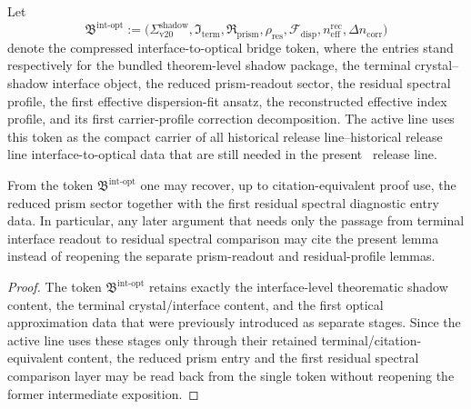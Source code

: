 \begin{definition}
\label{def:v320-crystal-shadow-interface-object}
\label{def:reduced-prism-readout-sector}
\label{def:prism-readout-residual-profile}
\label{def:first-effective-carrier-dispersion-fit-ansatz}
\label{def:first-reconstructed-effective-refractive-profile}
\label{def:first-carrier-profile-correction-decomposition}
Let
\[
\mathfrak B^{\mathrm{int\text{-}opt}}
:=
\bigl(
\Sigma^{\mathrm{shadow}}_{\mathrm{v20}},
\mathfrak I_{\mathrm{term}},
\mathfrak R_{\mathrm{prism}},
\rho_{\mathrm{res}},
\mathcal F_{\mathrm{disp}},
 n^{\mathrm{rec}}_{\mathrm{eff}},
 \Delta n_{\mathrm{corr}}
\bigr)
\]
denote the compressed interface-to-optical bridge token, where the entries stand respectively for the bundled theorem-level shadow package, the terminal crystal--shadow interface object, the reduced prism-readout sector, the residual spectral profile, the first effective dispersion-fit ansatz, the reconstructed effective index profile, and its first carrier-profile correction decomposition. The active line uses this token as the compact carrier of all historical release line--historical release line interface-to-optical data that are still needed in the present \docversion\ release line.
\end{definition}

\begin{lemma}
\label{lem:first-prism-readout-lemma-on-the-retained-carrier-surface}
\label{lem:first-residual-spectral-diagnostic-lemma}
From the token $\mathfrak B^{\mathrm{int\text{-}opt}}$ one may recover, up to citation-equivalent proof use, the reduced prism sector together with the first residual spectral diagnostic entry data. In particular, any later argument that needs only the passage from terminal interface readout to residual spectral comparison may cite the present lemma instead of reopening the separate prism-readout and residual-profile lemmas.
\end{lemma}

\begin{proof}
The token $\mathfrak B^{\mathrm{int\text{-}opt}}$ retains exactly the interface-level theorematic shadow content, the terminal crystal/interface content, and the first optical approximation data that were previously introduced as separate stages. Since the active line uses these stages only through their retained terminal/citation-equivalent content, the reduced prism entry and the first residual spectral comparison layer may be read back from the single token without reopening the former intermediate exposition.
\end{proof}

